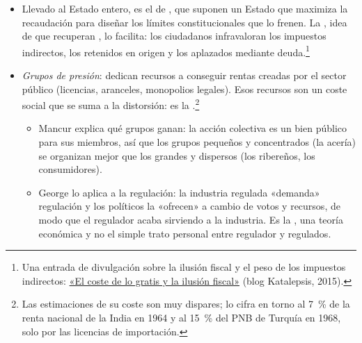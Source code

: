\documentclass[11pt]{article}
\begin{document}
\begin{itemize}
\begin{itemize}
  \item William \textcite{Niskanen1971Bureaucracy} supone que el burócrata maximiza el presupuesto de su departamento (del que dependen su poder y su prestigio) y, como conoce los costes mejor que el político que lo financia, logra un presupuesto mayor que el eficiente .\footnote{El político acepta cualquier programa cuyo beneficio total $B(G)$ cubra su coste total $C(G)$. El nivel eficiente, $G^*$, iguala beneficio y coste marginales; el burócrata elige el mayor $G$ con $B(G)=C(G)$, $G'>G^*$, y todo el excedente se pierde en el exceso de tamaño.}
  \end{itemize}
\item Llevado al Estado entero, es el  de \textcite{BrennanBuchanan1980Power}, que suponen un Estado que maximiza la recaudación para diseñar los límites constitucionales que lo frenen. La , idea de \textcite{Puviani1903Teoria} que recuperan \textcite{BuchananWagner1977Democracy}, lo facilita: los ciudadanos infravaloran los impuestos indirectos, los retenidos en origen y los aplazados mediante deuda.\footnote{Una entrada de divulgación sobre la ilusión fiscal y el peso de los impuestos indirectos: \href{https://katalepsisblog.wordpress.com/2015/04/21/el-coste-de-lo-gratis-y-la-ilusion-fiscal/}{«El coste de lo gratis y la ilusión fiscal»} (blog Katalepsis, 2015).}
\item \emph{Grupos de presión}: dedican recursos a conseguir rentas creadas por el sector público (licencias, aranceles, monopolios legales). Esos recursos son un coste social que se suma a la distorsión: es la \nocite{Tullock1967Welfare,Krueger1974Political} .\footnote{Las estimaciones de su coste son muy dispares; \textcite{Krueger1974Political} lo cifra en torno al 7~\% de la renta nacional de la India en 1964 y al 15~\% del PNB de Turquía en 1968, solo por las licencias de importación.}
  \begin{itemize}
  \item Mancur \textcite{Olson1965Logic} explica qué grupos ganan: la acción colectiva es un bien público para sus miembros, así que los grupos pequeños y concentrados (la acería) se organizan mejor que los grandes y dispersos (los ribereños, los consumidores).
  \item George \textcite{Stigler1971Theory} lo aplica a la regulación: la industria regulada «demanda» regulación y los políticos la «ofrecen» a cambio de votos y recursos, de modo que el regulador acaba sirviendo a la industria. Es la , una teoría económica y no el simple trato personal entre regulador y regulados.

\end{itemize}
\end{itemize}
\end{document}
